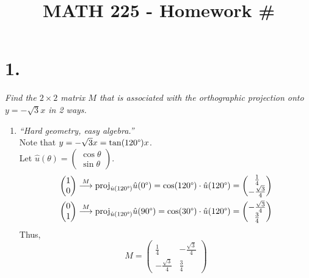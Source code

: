 \documentclass[12pt]{article}
\title{\vspace{-4\baselineskip}MATH 225 - Homework \#\HOMEWORKNUM}
\author{\NAME}
\date{\DATE}
\begin{document}
\maketitle

\section*{1.}
\textit{Find the $2 \times 2$ matrix $M$ that is associated with the
orthographic projection onto ${y = -\sqrt{3}x}$ in 2 ways.}
\begin{enumerate}[label=(\alph*)]
	\item \textit{``Hard geometry, easy algebra.''}
	\\[\baselineskip]
	Note that $y = -\sqrt{3}x = \tan(120 \degree)x$. \\
	Let $\hat u(\theta) =
	\begin{pmatrix} \cos \theta \\ \sin \theta \end{pmatrix}$.
	\begin{gather*}
		\begin{pmatrix} 1 \\ 0 \end{pmatrix}
		\overset{M}{\longrightarrow}
		\text{proj}_{\hat u(120 \degree)} \hat u(0 \degree)
		=
		\cos(120 \degree) \cdot \hat u(120 \degree)
		=
		\begin{pmatrix} \frac{1}{4} \\ -\frac{\sqrt{3}}{4} \end{pmatrix}
		\\
		\begin{pmatrix} 0 \\ 1 \end{pmatrix}
		\overset{M}{\longrightarrow}
		\text{proj}_{\hat u(120 \degree)} \hat u(90 \degree)
		=
		\cos(30 \degree) \cdot \hat u(120 \degree)
		=
		\begin{pmatrix} -\frac{\sqrt{3}}{4} \\ \frac{3}{4} \end{pmatrix}
	\end{gather*}
	Thus,
	\begin{equation*}
		M =
		\boxed{
			\begin{pmatrix}
				\frac{1}{4} & -\frac{\sqrt{3}}{4} \\
				-\frac{\sqrt{3}}{4} & \frac{3}{4}
			\end{pmatrix}
}
\end{equation*}
\end{enumerate}
\end{document}
